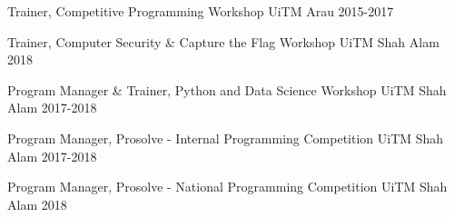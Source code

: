 

\begin{cvhonors}

  \cvhonor
    {Trainer,} %
    {Competitive Programming Workshop} %
    {UiTM Arau} %
    {2015-2017} %

  \cvhonor
    {Trainer,} %
    {Computer Security \& Capture the Flag Workshop} %
    {UiTM Shah Alam} %
    {2018} %

  \cvhonor
    {Program Manager \& Trainer,} %
    {Python and Data Science Workshop} %
    {UiTM Shah Alam} %
    {2017-2018} %

  \cvhonor
    {Program Manager,} %
    {Prosolve - Internal Programming Competition} %
    {UiTM Shah Alam} %
    {2017-2018} %

  \cvhonor
    {Program Manager,} %
    {Prosolve - National Programming Competition} %
    {UiTM Shah Alam} %
    {2018} %

\end{cvhonors}
